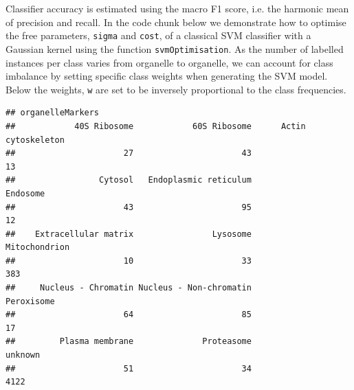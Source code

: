 Classifier accuracy is estimated using the macro F1 score, i.e. the
harmonic mean of precision and recall. In the code chunk below we
demonstrate how to optimise the free parameters, \texttt{sigma} and
\texttt{cost}, of a classical SVM classifier with a Gaussian kernel
using the function \texttt{svmOptimisation}. As the number of labelled
instances per class varies from organelle to organelle, we can account
for class imbalance by setting specific class weights when generating
the SVM model. Below the weights, \texttt{w} are set to be inversely
proportional to the class frequencies.



\begin{knitrout}
\color{fgcolor}\begin{kframe}
\begin{alltt}
 \hlkwb{<-} \hlstd{(}  \hlstd{=} \hlstd{))}
\end{alltt}
\begin{verbatim}
## organelleMarkers
##            40S Ribosome            60S Ribosome      Actin cytoskeleton 
##                      27                      43                      13 
##                 Cytosol   Endoplasmic reticulum                Endosome 
##                      43                      95                      12 
##    Extracellular matrix                Lysosome           Mitochondrion 
##                      10                      33                     383 
##     Nucleus - Chromatin Nucleus - Non-chromatin              Peroxisome 
##                      64                      85                      17 
##         Plasma membrane              Proteasome                 unknown 
##                      51                      34                    4122
\end{verbatim}
\begin{alltt}
 \hlkwb{<-} \hlopt{/}\hlstd{w[} \hlopt{!=} \hlstd{]}
\end{alltt}
\end{kframe}
\end{knitrout}

\begin{knitrout}
\color{fgcolor}\begin{kframe}
\begin{alltt}
 \hlkwb{<-}   \hlstd{=} \hlstd{,}
                           \hlstd{=} \hlstd{,}  \hlstd{=} \hlstd{,}
                           
\end{alltt}
\end{kframe}
\end{knitrout}

